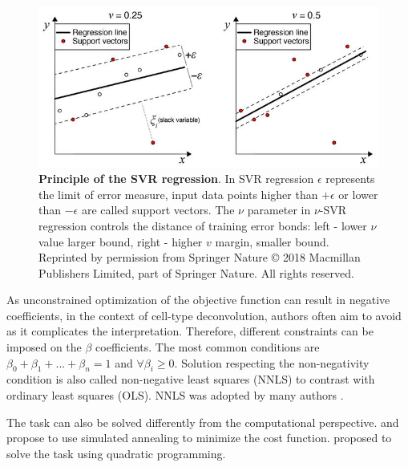 \documentclass[12pt,]{book}
\theoremstyle{definition}
\theoremstyle{definition}
\theoremstyle{definition}
\theoremstyle{remark}
\begin{document}
\begin{figure}

{\centering \includegraphics[width=1\linewidth]{figures-ext/vSVR} 

}

\caption[Priciple of the SVR regression]{\textbf{Principle of the SVR regression}. In SVR
regression \(\epsilon\) represents the limit of error measure, input
data points higher than \(+\epsilon\) or lower than \(-\epsilon\) are
called support vectors. The \(\nu\) parameter in \(\nu\)-SVR regression
controls the distance of training error bonds: left - lower \(\nu\)
value larger bound, right - higher \(v\) margin, smaller bound.
Reprinted by permission from Springer Nature \citep{Newman2015} © 2018
Macmillan Publishers Limited, part of Springer Nature. All rights
reserved.}\label{fig:svr}
\end{figure}











As unconstrained optimization of the objective function can result in
negative coefficients, in the context of cell-type deconvolution,
authors often aim to avoid as it complicates the interpretation.
Therefore, different constraints can be imposed on the \(\beta\)
coefficients. The most common conditions are
\(\beta_0 +\beta_1+ ...+\beta_n =1\) and \(\forall\beta_i \geq 0\).
Solution respecting the non-negativity condition is also called
non-negative least squares (NNLS) to contrast with ordinary least
squares (OLS). NNLS was adopted by many authors
\citep{Venet2001, Abbas2009, Repsilber2010, Zuckerman2013, Wang2016}.

The task can also be solved differently from the computational
perspective. \citet{Lu2003} and \citet{Wang2006} propose to use
simulated annealing to minimize the cost function. \citet{Gong2011}
proposed to solve the task using quadratic programming.
\end{document}
